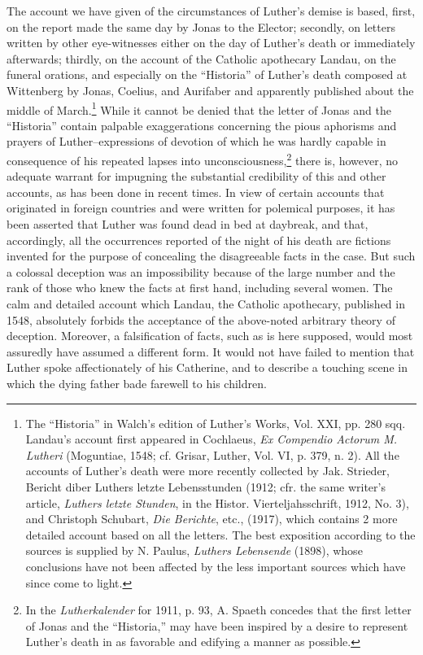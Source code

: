 The account we have given of the circumstances of Luther’s demise
is based, first, on the report made the same day by Jonas to the
Elector; secondly, on letters written by other eye-witnesses either on
the day of Luther’s death or immediately afterwards; thirdly, on the
account of the Catholic apothecary Landau, on the funeral orations,
and especially on the “Historia” of Luther’s death composed at Wittenberg
by Jonas, Coelius, and Aurifaber and apparently published
about the middle of March.\footnote{The “Historia” in Walch’s edition of Luther’s Works, Vol. XXI, pp. 280 sqq. Landau’s
account first appeared in Cochlaeus, \textit{Ex Compendio Actorum M. Lutheri} (Moguntiae, 1548;
cf. Grisar, Luther, Vol. VI, p. 379, n. 2). All the accounts of Luther’s death were more
recently collected by Jak. Strieder, Bericht diber Luthers letzte Lebensstunden (1912; cfr.
the same writer’s article, \textit{Luthers letzte Stunden}, in the Histor. Vierteljahsschrift, 1912,
No. 3), and Christoph Schubart, \textit{Die Berichte}, etc., (1917), which contains 2 more detailed
account based on all the letters. The best exposition according to the sources is supplied
by N. Paulus, \textit{Luthers Lebensende} (1898), whose conclusions have not been affected by the
less important sources which have since come to light.}
While it cannot be denied that the
letter of Jonas and the “Historia” contain palpable exaggerations
concerning the pious aphorisms and prayers of Luther--expressions
of devotion of which he was hardly capable in consequence of his
repeated lapses into unconsciousness,\footnote
{In the \textit{Lutherkalender} for 1911, p. 93, A. Spaeth concedes that the first letter of Jonas
and the “Historia,” may have been inspired by a desire to represent Luther’s death in as
favorable and edifying a manner as possible.}
there is, however, no adequate
warrant for impugning the substantial credibility of this and other
accounts, as has been done in recent times. In view of certain accounts
that originated in foreign countries and were written for polemical purposes,
it has been asserted that Luther was found dead in bed at daybreak,
and that, accordingly, all the occurrences reported of the night
of his death are fictions invented for the purpose of concealing
the disagreeable facts in the case. But such a colossal deception was
an impossibility because of the large number and the rank of those
who knew the facts at first hand, including several women. The calm
and detailed account which Landau, the Catholic apothecary, published
in 1548, absolutely forbids the acceptance of the above-noted
arbitrary theory of deception. Moreover, a falsification of facts, such as
is here supposed, would most assuredly have assumed a different form.
It would not have failed to mention that Luther spoke affectionately
of his Catherine, and to describe a touching scene in which the dying
father bade farewell to his children.

